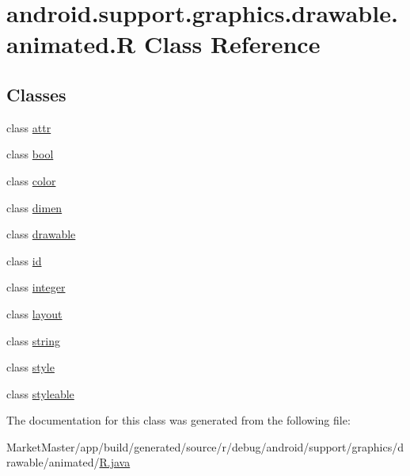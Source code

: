 \hypertarget{classandroid_1_1support_1_1graphics_1_1drawable_1_1animated_1_1R}{}\section{android.\+support.\+graphics.\+drawable.\+animated.\+R Class Reference}
\label{classandroid_1_1support_1_1graphics_1_1drawable_1_1animated_1_1R}
\subsection*{Classes}
\begin{DoxyCompactItemize}
\item 
class \mbox{\hyperlink{classandroid_1_1support_1_1graphics_1_1drawable_1_1animated_1_1R_1_1attr}{attr}}
\item 
class \mbox{\hyperlink{classandroid_1_1support_1_1graphics_1_1drawable_1_1animated_1_1R_1_1bool}{bool}}
\item 
class \mbox{\hyperlink{classandroid_1_1support_1_1graphics_1_1drawable_1_1animated_1_1R_1_1color}{color}}
\item 
class \mbox{\hyperlink{classandroid_1_1support_1_1graphics_1_1drawable_1_1animated_1_1R_1_1dimen}{dimen}}
\item 
class \mbox{\hyperlink{classandroid_1_1support_1_1graphics_1_1drawable_1_1animated_1_1R_1_1drawable}{drawable}}
\item 
class \mbox{\hyperlink{classandroid_1_1support_1_1graphics_1_1drawable_1_1animated_1_1R_1_1id}{id}}
\item 
class \mbox{\hyperlink{classandroid_1_1support_1_1graphics_1_1drawable_1_1animated_1_1R_1_1integer}{integer}}
\item 
class \mbox{\hyperlink{classandroid_1_1support_1_1graphics_1_1drawable_1_1animated_1_1R_1_1layout}{layout}}
\item 
class \mbox{\hyperlink{classandroid_1_1support_1_1graphics_1_1drawable_1_1animated_1_1R_1_1string}{string}}
\item 
class \mbox{\hyperlink{classandroid_1_1support_1_1graphics_1_1drawable_1_1animated_1_1R_1_1style}{style}}
\item 
class \mbox{\hyperlink{classandroid_1_1support_1_1graphics_1_1drawable_1_1animated_1_1R_1_1styleable}{styleable}}
\end{DoxyCompactItemize}


The documentation for this class was generated from the following file\+:\begin{DoxyCompactItemize}
\item 
Market\+Master/app/build/generated/source/r/debug/android/support/graphics/drawable/animated/\mbox{\hyperlink{debug_2android_2support_2graphics_2drawable_2animated_2R_8java}{R.\+java}}\end{DoxyCompactItemize}
